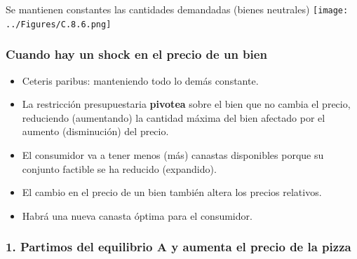\documentclass{beamer}
\begin{document}
\begin{frame}{Se mantienen constantes las cantidades demandadas (bienes neutrales)}
    \centering
    \texttt{[image: ../Figures/C.8.6.png]}
\end{frame}

\begin{frame}
\frametitle{Cuando hay un shock en el precio de un bien}
\begin{itemize}
    \item Ceteris paribus: manteniendo todo lo demás constante.
    \item La restricción presupuestaria \textbf{pivotea} sobre el bien que no cambia el precio, reduciendo (aumentando) la cantidad máxima del bien afectado por el aumento (disminución) del precio.  
    \item El consumidor va a tener menos (más) canastas disponibles porque su conjunto factible se ha reducido (expandido).
    \item El cambio en el precio de un bien también altera los precios relativos. 
    \item Habrá una nueva canasta óptima para el consumidor.
\end{itemize}
\end{frame}

\begin{frame}
\frametitle{1. Partimos del equilibrio A y aumenta el precio de la pizza}
\begin{center}
\begin{figure}[H]
\renewcommand{\figurename}{Figure}
\begin{center}
\end{center}
\end{figure}
\end{center}
\end{frame}
\end{document}
